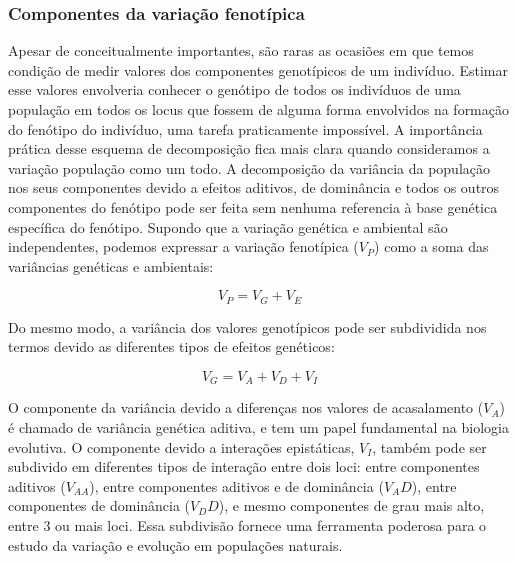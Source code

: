 \begin{refsection}
\subsubsection{Componentes da variação fenotípica}

Apesar de conceitualmente importantes, são raras as ocasiões em que temos
condição de medir valores dos componentes genotípicos de um indivíduo. Estimar
esse valores envolveria conhecer o genótipo de todos os indivíduos de uma
população em todos os locus que fossem de alguma forma envolvidos na formação
do fenótipo do indivíduo, uma tarefa praticamente impossível. A importância
prática desse esquema de decomposição fica mais clara quando consideramos a
variação população como um todo. A decomposição da variância da população nos
seus componentes devido a efeitos aditivos, de dominância e todos os outros
componentes do fenótipo pode ser feita sem nenhuma referencia à base genética
específica do fenótipo. Supondo que a variação genética e ambiental são
independentes, podemos expressar a variação fenotípica ($V_P$) como a soma das
variâncias genéticas e ambientais:

\begin{equation}
V_P = V_G + V_E
\end{equation}

Do mesmo modo, a variância dos valores genotípicos pode ser subdividida nos termos devido as diferentes tipos de efeitos genéticos:

\begin{equation}
V_G = V_A + V_D + V_I
\end{equation}

O componente da variância devido a diferenças nos valores de acasalamento
($V_A$) é chamado de variância genética aditiva, e tem um papel fundamental na
biologia evolutiva. O componente devido a interações epistáticas, $V_I$,
também pode ser subdivido em diferentes tipos de interação entre dois loci:
entre componentes aditivos ($V_{AA}$), entre componentes aditivos e de
dominância ($V_AD$), entre componentes de dominância ($V_DD$), e mesmo
componentes de grau mais alto, entre 3 ou mais loci. Essa subdivisão fornece
uma ferramenta poderosa para o estudo da variação e evolução em populações
naturais.


\end{refsection}
